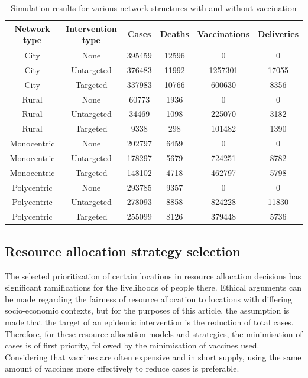\documentclass[10pt,letterpaper]{article}
\begin{document}
\begin{table}[ht!]
\centering
\begin{tabular}{|c|c|c|c|c|c|}
\hline
Network type & Intervention type & Cases     & Deaths   & Vaccinations & Deliveries \\ \hline
City & None  & 395459 & 12596 & 0            & 0         \\
City & Untargeted & 376483 & 11992 & 1257301      & 17055     \\
City & Targeted & 337983 & 10766 & 600630      & 8356     \\
Rural & None & 60773  & 1936  & 0            & 0         \\
Rural & Untargeted & 34469  & 1098  & 225070       & 3182      \\
Rural & Targeted & 9338  & 298  & 101482       &  1390      \\
Monocentric & None & 202797 & 6459  & 0        & 0         \\
Monocentric & Untargeted & 178297 & 5679  & 724251   & 8782      \\
Monocentric & Targeted & 148102 & 4718  & 462797   & 5798      \\
Polycentric & None & 293785 & 9357  & 0        & 0         \\
Polycentric & Untargeted & 278093 & 8858  & 824228   & 11830     \\
Polycentric & Targeted & 255099 & 8126  & 379448        & 5736         \\\hline
\end{tabular}
\caption{Simulation results for various network structures with and without vaccination}
\label{tab:base}
\end{table}

\subsection*{Resource allocation strategy selection}
The selected prioritization of certain locations in resource allocation decisions has significant ramifications for the livelihoods of people there. Ethical arguments can be made regarding the fairness of resource allocation to locations with differing socio-economic contexts, but for the purposes of this article, the assumption is made that the target of an epidemic intervention is the reduction of total cases. Therefore, for these resource allocation models and strategies, the minimisation of cases is of first priority, followed by the minimisation of vaccines used. Considering that vaccines are often expensive and in short supply, using the same amount of vaccines more effectively to reduce cases is preferable.
\end{document}
